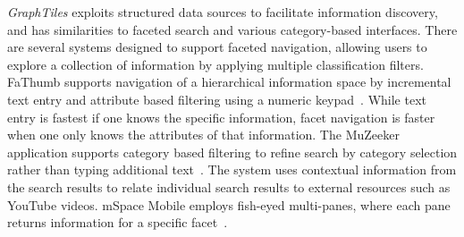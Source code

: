 


\textit{GraphTiles} exploits structured data sources to facilitate information discovery, and has similarities to faceted search and various category-based interfaces. There are several systems designed to support faceted navigation, allowing users to explore a collection of information by applying multiple classification filters. FaThumb supports navigation of a hierarchical information space by incremental text entry and attribute based filtering using a numeric keypad~\cite{Karlson:2006}. While text entry is fastest if one knows the specific information, facet navigation is faster when one only knows the attributes of that information. The MuZeeker application supports category based filtering to refine search by category selection rather than typing additional text~\cite{Larsen:2010}. The system uses contextual information from the search results to relate individual search results to external resources such as YouTube videos. mSpace Mobile employs fish-eyed multi-panes, where each pane returns information for a specific facet~\cite{mspace}.


